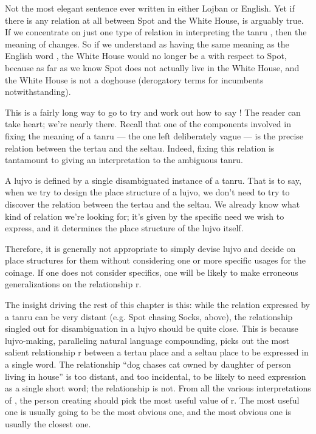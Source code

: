 Not the most elegant sentence ever written in either Lojban or
    English. Yet if there is any relation at all between Spot and
    the White House,  is arguably
    true. If we concentrate on just one type of relation in
    interpreting the tanru , then the meaning of
     changes. So if we understand  as
    having the same meaning as the English word , the
    White House would no longer be a  with respect
    to Spot, because as far as we know Spot does not actually live
    in the White House, and the White House is not a doghouse
    (derogatory terms for incumbents notwithstanding).



This is a fairly long way to go to try and work out how to
    say ! The reader can take heart; we're nearly
    there. Recall that one of the components involved in fixing the
    meaning of a tanru --- the one left deliberately vague --- is
    the precise relation between the tertau and the seltau. Indeed,
    fixing this relation is tantamount to giving an interpretation
    to the ambiguous tanru.

A lujvo is defined by a single disambiguated instance of a
    tanru. That is to say, when we try to design the place
    structure of a lujvo, we don't need to try to discover the
    relation between the tertau and the seltau. We already know
    what kind of relation we're looking for; it's given by the
    specific need we wish to express, and it determines the place
    structure of the lujvo itself.

Therefore, it is generally not appropriate to simply devise
    lujvo and decide on place structures for them without
    considering one or more specific usages for the coinage. If one
    does not consider specifics, one will be likely to make
    erroneous generalizations on the relationship r.

The insight driving the rest of this chapter is this: while
    the relation expressed by a tanru can be very distant (e.g.
    Spot chasing Socks, above), the relationship singled out for
    disambiguation in a lujvo should be quite close. This is
    because lujvo-making, paralleling natural language compounding,
    picks out the most salient relationship r between a tertau
    place and a seltau place to be expressed in a single word. The
    relationship ``dog chases cat owned by daughter of person
    living in house'' is too distant, and too incidental, to be
    likely to need expression as a single short word; the
    relationship  is not. From all the
    various interpretations of , the person creating
     should pick the most useful value of r. The most
    useful one is usually going to be the most obvious one, and the
    most obvious one is usually the closest one.

